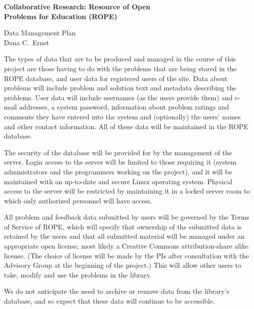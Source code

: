 \documentclass[11pt]{article}
\begin{document}
\begin{center}
{\Large \textbf{Collaborative Research: Resource of Open \\ 
Problems for Education (ROPE)}}

\bigskip

{\Large Data Management Plan}\\
\smallskip
Dana C.~Ernst
\end{center}

The types of data that are to be produced and managed in the course of
this project are those having to do with the problems that are being
stored in the ROPE database, and user data for registered users of the
site.  Data about problems will include problem and solution text and
metadata describing the problems.  User data will include usernames (as
the users provide them) and e-mail addresses, a system password,
information about problem ratings and comments they have entered into the
system and (optionally) the users' names and other contact information.
All of these data will be maintained in the ROPE database.

The security of the database will be provided for by the management of the
server.  Login access to the server will be limited to those requiring it
(system administrators and the programmers working on the project), and it
will be maintained with an up-to-date and secure Linux operating system.
Physical access to the server will be restricted by maintaining it in a
locked server room to which only authorized personnel will have access.

All problem and feedback data submitted by users will be governed by the
Terms of Service of ROPE, which will specify that ownership of the
submitted data is retained by the users and that all submitted material
will be managed under an appropriate open license, most likely a Creative
Commons attribution-share alike license.  (The choice of license will be
made by the PIs after consultation with the Advisory Group at the
beginning of the project.)  This will allow other users to take, modify
and use the problems in the library.

We do not anticipate the need to archive or remove data from the library's
database, and so expect that these data will continue to be accessible.
\end{document}
